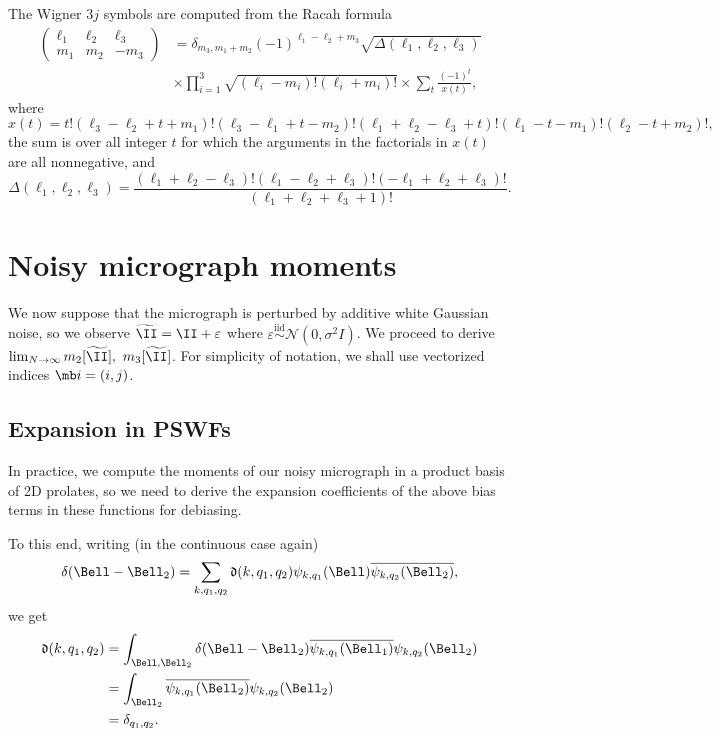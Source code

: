 \documentclass[9pt,twocolumn,twoside,lineno]{pnas-new}
\begin{document}
The Wigner 3$j$ symbols are computed from the Racah formula
\[\begin{aligned} \left(\begin{array}{ccc}\ell_1 & \ell_2  & \ell_3\\ m_1 & m_2 & -m_3\end{array}\right) &= \delta_{m_3,m_1+m_2}(-1)^{\ell_1-\ell_2+m_3}\sqrt{\Delta(\ell_1,\ell_2,\ell_3)}\\ &\times \prod_{i=1}^3\sqrt{(\ell_i-m_i)!(\ell_i+m_i)!}\times \sum_{t}\frac{(-1)^t}{x(t)},\end{aligned}\]
where
\[ x(t) = t!(\ell_3-\ell_2+t+m_1)!(\ell_3-\ell_1+t-m_2)!(\ell_1+\ell_2-\ell_3+t)!(\ell_1-t-m_1)!(\ell_2-t+m_2)!,\]
the sum is over all integer $t$ for which the arguments in the factorials in $x(t)$ are all nonnegative, and 
\[ \Delta(\ell_1,\ell_2,\ell_3) = \frac{(\ell_1+\ell_2-\ell_3)!(\ell_1-\ell_2+\ell_3)!(-\ell_1+\ell_2+\ell_3)!}{(\ell_1+\ell_2+\ell_3+1)!}.\]


\section{Noisy micrograph moments}
We now suppose that the micrograph is perturbed by additive white
Gaussian noise, so we observe $\widetilde \II = \II + \varepsilon$ where
$\varepsilon\overset{\text{iid}}{\sim}\mathcal{N}(0, \sigma^2I)$. We proceed
to derive $\lim_{N\to\infty}m_2[\widetilde \II],\
m_3[\widetilde\II]$. For simplicity of notation,
we shall use vectorized indices $\mb i = (i,j)$.


\subsection{Expansion in PSWFs}
In practice, we compute the moments of our noisy micrograph in a
product basis of 2D prolates, so we need to derive the expansion
coefficients of the above bias terms in these functions for debiasing.

To this end, writing (in the continuous case again)
\[ \delta(\Bell - \Bell_2) =
\sum_{k,q_1,q_2}\mathfrak{d}(k,q_1,q_2) \psi_{k,q_1}(\Bell)
\overline{\psi_{k,q_2}(\Bell_2)},\]
we get
\[\begin{aligned}
\mathfrak{d}(k,q_1,q_2) &= \int_{\Bell,
	\Bell_2}\delta(\Bell-\Bell_2)\overline{\psi_{k,q_1}(\Bell_1)}\psi_{k,q_2}(\Bell_2)\\
&=
\int_{\Bell_2}\overline{\psi_{k,q_1}(\Bell_2)}\psi_{k,q_2}(\Bell_2)\\
&= \delta_{q_1,q_2}.
\end{aligned}\]
\end{document}
